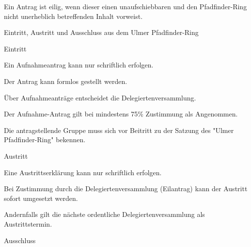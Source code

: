 \begin{legal}
\begin{legal}
\begin{legal}
\begin{legal}
                            \item Ein Antrag ist eilig, wenn dieser einen unaufschiebbaren und den 
                                  Pfadfinder-Ring nicht unerheblich betreffenden Inhalt vorweist.
                        \end{legal}
                \end{legal}
        \end{legal}
    \item Eintritt, Austritt und Ausschluss aus dem Ulmer Pfadfinder-Ring
        \begin{legal}
            \item Eintritt
                \begin{legal}
                    \item Ein Aufnahmeantrag kann nur schriftlich erfolgen.
                        \begin{legal}
                            \item Der Antrag kann formlos gestellt werden.
                        \end{legal}
                    \item Über Aufnahmeanträge entscheidet die Delegiertenversammlung.
                        \begin{legal}
                            \item Der Aufnahme-Antrag gilt bei mindestens 75\% Zustimmung als 
                                  Angenommen.
                        \end{legal}
                    \item Die antragstellende Gruppe muss sich vor Beitritt zu der Satzung des 
                          "Ulmer Pfadfinder-Ring" bekennen.
                \end{legal}
            \item Austritt
                \begin{legal}
                    \item Eine Austrittserklärung kann nur schriftlich erfolgen.
                    \item Bei Zustimmung durch die Delegiertenversammlung (Eilantrag) kann der 
                          Austritt sofort umgesetzt werden.
                    \item Andernfalls gilt die nächste ordentliche Delegiertenversammlung als 
                          Austrittstermin.
                \end{legal}
            \item Ausschluss

\end{legal}
\end{legal}
